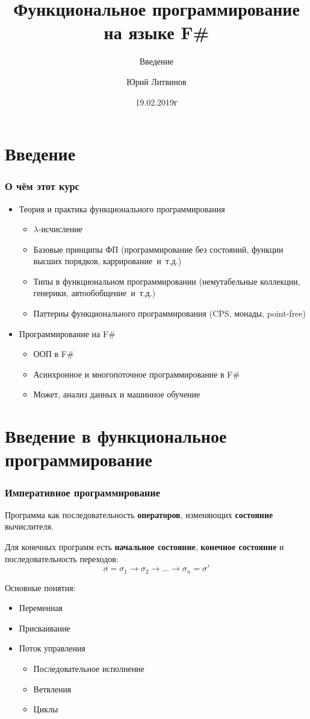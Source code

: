 \documentclass[xetex,mathserif,serif]{beamer}
\title{Функциональное программирование на языке F\#}
\subtitle{Введение}
\author{Юрий Литвинов}
\date{19.02.2019г}
\begin{document}
	
	\frame{\titlepage}
	
	\section{Введение}
	
	\begin{frame}
		\frametitle{О чём этот курс}
		\begin{itemize}
			\item Теория и практика функционального программирования
			\begin{itemize}
				\item $\lambda$-исчисление
				\item Базовые принципы ФП (программирование без состояний, функции высших порядков, каррирование~и~т.д.)
				\item Типы в функциональном программировании (немутабельные коллекции,
					генерики, автообобщение~и~т.д.)
				\item Паттерны функционального программирования (CPS, монады, point-free)
			\end{itemize}
			\item Программирование на F\# 
			\begin{itemize}
				\item ООП в F\#
				\item Асинхронное и многопоточное программирование в F\#
				\item Может, анализ данных и машинное обучение
			\end{itemize}
		\end{itemize}
	\end{frame}

	\section{Введение в функциональное программирование}
	
	\begin{frame}
		\frametitle{Императивное программирование}
		Программа как последовательность \textbf{операторов}, изменяющих \textbf{состояние} вычислителя.

		Для конечных программ есть \textbf{начальное состояние}, \textbf{конечное состояние} и последовательность переходов:
		$$\sigma = \sigma_1 \rightarrow \sigma_2 \rightarrow ... \rightarrow \sigma_n = \sigma'$$
		
		Основные понятия:
		\begin{itemize}
			\item Переменная
			\item Присваивание
			\item Поток управления
			\begin{itemize}
				\item Последовательное исполнение
				\item Ветвления
				\item Циклы
			\end{itemize}
		\end{itemize}
	\end{frame}
	
\end{document}
